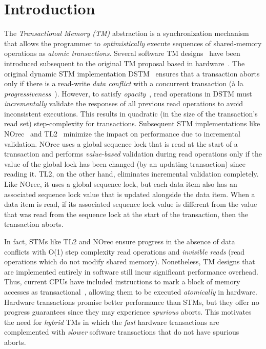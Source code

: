 \section{Introduction}
\label{sec:intro}
%
%
The \emph{Transactional Memory (TM)} abstraction is a synchronization mechanism 
that allows the programmer to \emph{optimistically} execute sequences of shared-memory
operations as \emph{atomic transactions}.
Several software TM designs~\cite{norec, ST95,HLM+03,fraser} have been introduced subsequent to the original TM proposal based in
hardware~\cite{HM93}. 
The original dynamic STM implementation DSTM~\cite{HLM+03} ensures that a transaction aborts only if there is a read-write \emph{data conflict} with a concurrent
transaction (\`a la \emph{progressiveness}~\cite{tm-book}). However, to satisfy \emph{opacity}~\cite{tm-book}, read operations in DSTM must \emph{incrementally} validate
the responses of all previous read operations to avoid inconsistent executions. 
This results in quadratic  (in the size of the transaction's read
set) step-complexity for transactions. Subsequent STM 
implementations like NOrec~\cite{norec} and TL2~\cite{DSS06}
minimize the impact on performance due to incremental validation.
NOrec uses a global sequence lock that is read at the start of a transaction and performs \emph{value-based}
validation during read operations only if the value of the global lock has been changed (by an updating transaction) 
since reading it.
TL2, on the other hand, eliminates incremental validation completely.
Like NOrec, it uses a global sequence lock, but each data item also 
has an associated sequence lock value that is updated alongside the data item.
When a data item is read, if its associated sequence lock value is different 
from the value that was read from the sequence lock at the start of the transaction, then the transaction aborts.

In fact, STMs like TL2 and NOrec ensure progress in the absence of data conflicts with 
O(1) step complexity read operations and \emph{invisible reads} (read operations which 
do not modify shared memory).
Nonetheless, TM designs that are implemented entirely in software still incur significant performance overhead.
Thus, current CPUs have included instructions to mark a block of memory accesses as transactional~\cite{asf, bluegene}, allowing them to be executed \emph{atomically} in hardware.
Hardware transactions promise better performance than STMs, but they offer no progress guarantees 
since they may experience \emph{spurious} aborts. This motivates the need for
\emph{hybrid} TMs in which the \emph{fast} hardware transactions are 
complemented with \emph{slower} software transactions that do not have spurious aborts.

